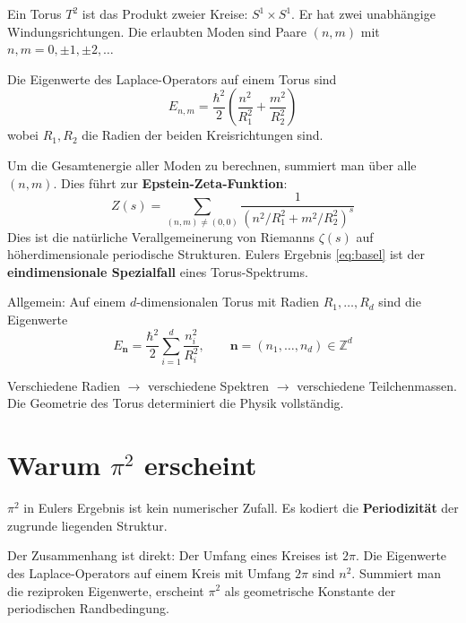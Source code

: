 	Ein Torus $T^2$ ist das Produkt zweier Kreise: $S^1 \times S^1$. Er hat zwei unabhängige Windungsrichtungen. Die erlaubten Moden sind Paare $(n,m)$ mit $n, m = 0, \pm 1, \pm 2, \ldots$
	
	Die Eigenwerte des Laplace-Operators auf einem Torus sind
	\begin{equation}
		E_{n,m} = \frac{\hbar^2}{2} \left( \frac{n^2}{R_1^2} + \frac{m^2}{R_2^2} \right)
		\label{eq:torus-eigenwerte}
	\end{equation}
	wobei $R_1, R_2$ die Radien der beiden Kreisrichtungen sind.
	
	Um die Gesamtenergie aller Moden zu berechnen, summiert man über alle $(n,m)$. Dies führt zur \textbf{Epstein-Zeta-Funktion}:
	\begin{equation}
		Z(s) = \sum_{(n,m) \neq (0,0)} \frac{1}{\left( n^2/R_1^2 + m^2/R_2^2 \right)^s}
	\end{equation}
	Dies ist die natürliche Verallgemeinerung von Riemanns $\zeta(s)$ auf höherdimensionale periodische Strukturen. Eulers Ergebnis \eqref{eq:basel} ist der \textbf{eindimensionale Spezialfall} eines Torus-Spektrums.
	
	Allgemein: Auf einem $d$-dimensionalen Torus mit Radien $R_1, \ldots, R_d$ sind die Eigenwerte
	\begin{equation}
		E_{\mathbf{n}} = \frac{\hbar^2}{2} \sum_{i=1}^{d} \frac{n_i^2}{R_i^2}, \qquad \mathbf{n} = (n_1, \ldots, n_d) \in \mathbb{Z}^d
		\label{eq:d-torus-eigenwerte}
	\end{equation}
	
	\begin{keypoint}
		Verschiedene Radien $\rightarrow$ verschiedene Spektren $\rightarrow$ verschiedene Teilchenmassen. Die Geometrie des Torus determiniert die Physik vollständig.
	\end{keypoint}
	
	
	\section{Warum $\pi^2$ erscheint}
	
	$\pi^2$ in Eulers Ergebnis ist kein numerischer Zufall. Es kodiert die \textbf{Periodizität} der zugrunde liegenden Struktur.
	
	Der Zusammenhang ist direkt: Der Umfang eines Kreises ist $2\pi$. Die Eigenwerte des Laplace-Operators auf einem Kreis mit Umfang $2\pi$ sind $n^2$. Summiert man die reziproken Eigenwerte, erscheint $\pi^2$ als geometrische Konstante der periodischen Randbedingung.
	
